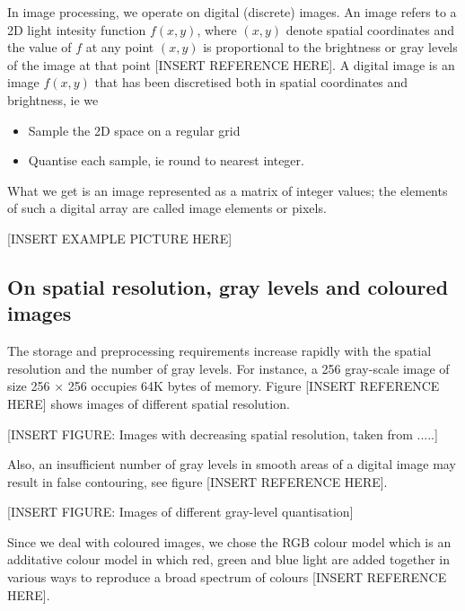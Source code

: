 In image processing, we operate on digital (discrete) images.
An image refers to a 2D light intesity function \( f(x,y) \), where \( (x,y) \) denote spatial coordinates and the value of \( f \) at any point \( (x,y) \) is proportional to the brightness or gray levels of the image at that point [INSERT REFERENCE HERE].
A digital image is an image \( f(x,y)  \) that has been discretised both in spatial coordinates and brightness, ie we

\begin{itemize}
	\item Sample the 2D space on a regular grid
	\item Quantise each sample, ie round to nearest integer.
\end{itemize}

What we get is an image represented as a matrix of integer values; the elements of such a digital array are called image elements or pixels.


[INSERT EXAMPLE PICTURE HERE]


\subsection{On spatial resolution, gray levels and coloured images}

The storage and preprocessing requirements increase rapidly with the spatial resolution and the number of gray levels. 
For instance, a 256 gray-scale image of size 256 \( \times \) 256 occupies 64K bytes of memory. Figure [INSERT REFERENCE HERE] shows images of different spatial resolution. 

[INSERT FIGURE: Images with decreasing spatial resolution, taken from .....]

Also, an insufficient number of gray levels in smooth areas of a digital image may result in false contouring, see figure [INSERT REFERENCE HERE].

[INSERT FIGURE: Images of different gray-level quantisation]


Since we deal with coloured images, we chose the RGB colour model which is an additative colour model in which red, green and blue light are added together in various ways to reproduce a broad spectrum of colours [INSERT REFERENCE HERE].


